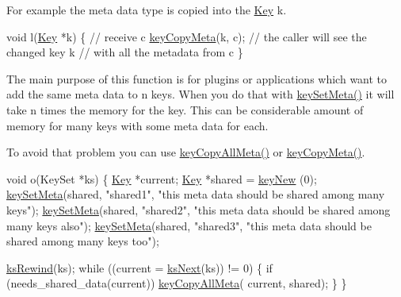 For example the meta data type is copied into the \hyperlink{classkdb_1_1Key}{Key} k.


\begin{DoxyCode}
\textcolor{keywordtype}{void} l(\hyperlink{classkdb_1_1Key_a5679f5cae63caddd64a60388b9cc77fa}{Key} *k)
\{
        \textcolor{comment}{// receive c}
        \hyperlink{group__keymeta_ga9a22b992478e613c8788bd460b4a1f0c}{keyCopyMeta}(k, c);
        \textcolor{comment}{// the caller will see the changed key k}
        \textcolor{comment}{// with all the metadata from c}
\}
\end{DoxyCode}


The main purpose of this function is for plugins or applications which want to add the same meta data to n keys. When you do that with \hyperlink{group__keymeta_gae1f15546b234ffb6007d8a31178652b9}{key\-Set\-Meta()} it will take n times the memory for the key. This can be considerable amount of memory for many keys with some meta data for each.

To avoid that problem you can use \hyperlink{group__keymeta_ga8e63720a65610a29597494d0671f9401}{key\-Copy\-All\-Meta()} or \hyperlink{group__keymeta_ga9a22b992478e613c8788bd460b4a1f0c}{key\-Copy\-Meta()}.


\begin{DoxyCode}
\textcolor{keywordtype}{void} o(KeySet *ks)
\{
        \hyperlink{classkdb_1_1Key_a5679f5cae63caddd64a60388b9cc77fa}{Key} *current;
        \hyperlink{classkdb_1_1Key_a5679f5cae63caddd64a60388b9cc77fa}{Key} *shared = \hyperlink{group__key_gaf6893c038b3ebee90c73a9ea8356bebf}{keyNew} (0);
        \hyperlink{group__keymeta_gae1f15546b234ffb6007d8a31178652b9}{keySetMeta}(shared, \textcolor{stringliteral}{"shared1"}, \textcolor{stringliteral}{"this meta data should be
       shared among many keys"});
        \hyperlink{group__keymeta_gae1f15546b234ffb6007d8a31178652b9}{keySetMeta}(shared, \textcolor{stringliteral}{"shared2"}, \textcolor{stringliteral}{"this meta data should be
       shared among many keys also"});
        \hyperlink{group__keymeta_gae1f15546b234ffb6007d8a31178652b9}{keySetMeta}(shared, \textcolor{stringliteral}{"shared3"}, \textcolor{stringliteral}{"this meta data should be
       shared among many keys too"});

        \hyperlink{group__keyset_gabe793ff51f1728e3429c84a8a9086b70}{ksRewind}(ks);
        \textcolor{keywordflow}{while} ((current = \hyperlink{group__keyset_ga317321c9065b5a4b3e33fe1c399bcec9}{ksNext}(ks)) != 0)
        \{
                \textcolor{keywordflow}{if} (needs\_shared\_data(current)) \hyperlink{group__keymeta_ga8e63720a65610a29597494d0671f9401}{keyCopyAllMeta}(
      current, shared);
        \}
\}
\end{DoxyCode}


